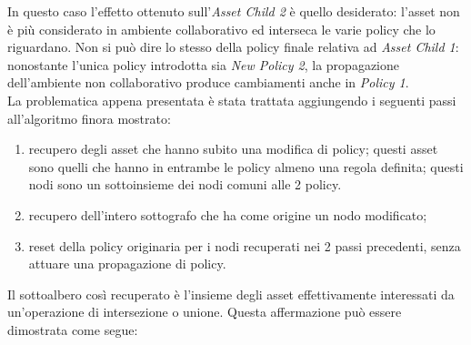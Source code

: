 \documentclass[12pt,a4paper,twoside]{book}
\begin{document}
In questo caso l'effetto ottenuto sull'\textit{Asset Child 2} è quello desiderato: l'asset non è più considerato in ambiente collaborativo ed interseca le varie policy che lo riguardano. Non si può dire lo stesso della policy finale relativa ad \textit{Asset Child 1}: nonostante l'unica policy introdotta sia \textit{New Policy 2}, la propagazione dell'ambiente non collaborativo produce cambiamenti anche in \textit{Policy 1}.\\
La problematica appena presentata è stata trattata aggiungendo i seguenti passi all'algoritmo finora mostrato:
\begin{enumerate}
\item recupero degli asset che hanno subito una modifica di policy; questi asset sono quelli che hanno in entrambe le policy almeno una regola definita; questi nodi sono un sottoinsieme dei nodi comuni alle 2 policy.
\item recupero dell'intero sottografo che ha come origine un nodo modificato;
\item reset della policy originaria per i nodi recuperati nei 2 passi precedenti, senza attuare una propagazione di policy.
\end{enumerate}
Il sottoalbero così recuperato è l'insieme degli asset effettivamente interessati da un'operazione di intersezione o unione. Questa affermazione può essere dimostrata come segue:
\end{document}
